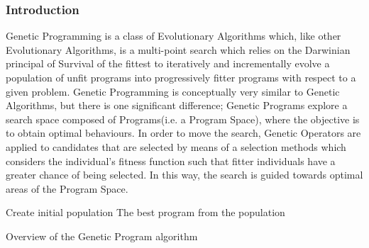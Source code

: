 \documentclass[a4paper,12pt]{article}
\begin{document}
                \subsubsection{Introduction}
                    \par{
                        Genetic Programming is a class of Evolutionary Algorithms which, like
                        other Evolutionary Algorithms, is a multi-point search which relies on the Darwinian
                        principal of Survival of the fittest to iteratively and incrementally evolve
                        a population of unfit programs into progressively fitter programs with respect
                        to a given problem.\newline 
                        \newline
                        Genetic Programming is conceptually very similar to Genetic Algorithms, but
                        there is one significant difference; Genetic Programs explore a search space
                        composed of Programs(i.e. a Program Space), where the objective is to obtain
                        optimal behaviours.\newline 
                        \newline
                        In order to move the search, Genetic Operators are applied to candidates that
                        are selected by means of a selection methods which considers the individual’s
                        fitness function such that fitter individuals have a greater chance of being selected. 
                        In this way, the search is guided towards optimal areas of the Program
                        Space.\newline
                        \newline 
                        \begin{algorithm}[H]
                            \SetAlgoLined
                            Create initial population\;
                            \Return The best program from the population 
                            \caption{Overview of the Genetic Program algorithm}
                            \label{alg:gp}
                        \end{algorithm} 
                    }
                
\end{document}
